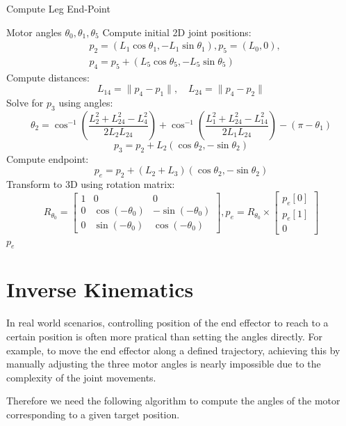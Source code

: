 \documentclass[a4paper,11pt]{article}
\begin{document}
\begin{algorithm}[H]
	\caption{Compute Leg End-Point}
	\begin{algorithmic}[1]
			\Require Motor angles $\theta_0, \theta_1, \theta_5$
			\State Compute initial 2D joint positions:
			\begin{align*}
				&p_2 = (L_1 \cos \theta_1, -L_1 \sin \theta_1), p_5 = (L_0, 0), \\
				&p_4 = p_5 + (L_5 \cos \theta_5, -L_5 \sin \theta_5)
			\end{align*}
			\State Compute distances:
			$$
					L_{14} = \| p_4 - p_1 \|, \quad
					L_{24} = \| p_4 - p_2 \|
			$$
			\State Solve for $p_3$ using angles:
			$$
					\theta_2 = \cos^{-1} \left( \frac{L_2^2 + L_{24}^2 - L_4^2}{2 L_2 L_{24}} \right) +
										 \cos^{-1} \left( \frac{L_1^2 + L_{24}^2 - L_{14}^2}{2 L_1 L_{24}} \right) - (\pi - \theta_1)
			$$
			$$
					p_3 = p_2 + L_2 (\cos \theta_2, -\sin \theta_2)
			$$
			\State Compute endpoint:
			$$
					p_e = p_2 + (L_2 + L_3)(\cos \theta_2, -\sin \theta_2)
			$$
			\State Transform to 3D using rotation matrix:
			$$
				R_{\theta_0} =
				\begin{bmatrix}
						1 & 0 & 0 \\
						0 & \cos(-\theta_0) & -\sin(-\theta_0) \\
						0 & \sin(-\theta_0) & \cos(-\theta_0)
				\end{bmatrix}, 
				p_e = R_{\theta_0} \times \begin{bmatrix} p_e[0] \\ p_e[1] \\ 0 \end{bmatrix}
			$$
			\State \Return $p_e$
	\end{algorithmic}
\end{algorithm}

\section*{Inverse Kinematics}

In real world scenarios, controlling position of the end effector to reach to a certain position
is often more pratical than setting the angles directly. For example, to move the end effector along 
a defined trajectory, achieving this by manually adjusting the three motor angles is nearly impossible 
due to the complexity of the joint movements. 

Therefore we need the following algorithm 
to compute the angles of the motor corresponding to a given target position.
\end{document}
